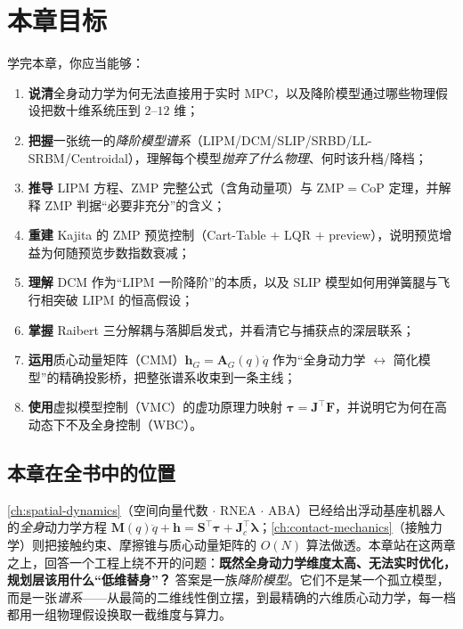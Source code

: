 \section*{本章目标}
学完本章，你应当能够：
\begin{enumerate}
  \item \textbf{说清}全身动力学为何无法直接用于实时 MPC，以及降阶模型通过哪些物理假设把数十维系统压到 $2$–$12$ 维；
  \item \textbf{把握}一张统一的\emph{降阶模型谱系}（LIPM/DCM/SLIP/SRBD/LL-SRBM/Centroidal），理解每个模型\emph{抛弃了什么物理}、何时该升档/降档；
  \item \textbf{推导} LIPM 方程、ZMP 完整公式（含角动量项）与 ZMP$=$CoP 定理，并解释 ZMP 判据“必要非充分”的含义；
  \item \textbf{重建} Kajita 的 ZMP 预览控制（Cart-Table $+$ LQR $+$ preview），说明预览增益为何随预览步数指数衰减；
  \item \textbf{理解} DCM 作为“LIPM 一阶降阶”的本质，以及 SLIP 模型如何用弹簧腿与飞行相突破 LIPM 的恒高假设；
  \item \textbf{掌握} Raibert 三分解耦与落脚启发式，并看清它与捕获点的深层联系；
  \item \textbf{运用}质心动量矩阵（CMM）$\mathbf{h}_G=\mathbf{A}_G(q)\dot{q}$ 作为“全身动力学 $\leftrightarrow$ 简化模型”的精确投影桥，把整张谱系收束到一条主线；
  \item \textbf{使用}虚拟模型控制（VMC）的虚功原理力映射 $\boldsymbol{\tau}=\mathbf{J}^\top\mathbf{F}$，并说明它为何在高动态下不及全身控制（WBC）。
\end{enumerate}

\subsection*{本章在全书中的位置}
\cref{ch:spatial-dynamics}（空间向量代数 $\cdot$ RNEA $\cdot$ ABA）已经给出浮动基座机器人的\emph{全身}动力学方程 $\mathbf{M}(q)\ddot{q}+\mathbf{h}=\mathbf{S}^\top\boldsymbol{\tau}+\mathbf{J}_c^\top\boldsymbol{\lambda}$；\cref{ch:contact-mechanics}（接触力学）则把接触约束、摩擦锥与质心动量矩阵的 $O(N)$ 算法做透。本章站在这两章之上，回答一个工程上绕不开的问题：\textbf{既然全身动力学维度太高、无法实时优化，规划层该用什么“低维替身”？} 答案是一族\emph{降阶模型}。它们不是某一个孤立模型，而是一张\emph{谱系}——从最简的二维线性倒立摆，到最精确的六维质心动力学，每一档都用一组物理假设换取一截维度与算力。

